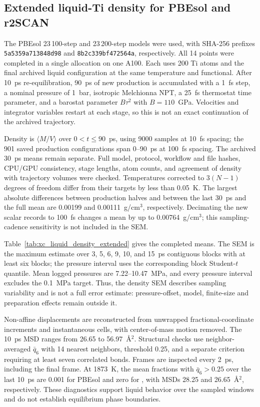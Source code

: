 \subsection{Extended liquid-Ti density for PBEsol and r2SCAN}
\label{sec:xc_liquid_density_extended}
The PBEsol 23\,100-step and \rscan{} 23\,200-step models were used, with SHA-256 prefixes \texttt{5a5359a7\allowbreak13848d98} and \texttt{8b2c339b\allowbreak f472564a}, respectively. All 14 points were completed in a single allocation on one A100. Each uses 200 Ti atoms and the final archived liquid configuration at the same temperature and functional. After 10~ps re-equilibration, 90~ps of new production is accumulated with a 1~fs step, a nominal pressure of 1~bar, isotropic Melchionna NPT, a 25~fs thermostat time parameter, and a barostat parameter $B\tau^2$ with $B=110$~GPa. Velocities and integrator variables restart at each stage, so this is not an exact continuation of the archived trajectory.

Density is $\langle M/V\rangle$ over $0<t\leq90$~ps, using 9000 samples at 10~fs spacing; the 901 saved production configurations span 0--90~ps at 100~fs spacing. The archived 30~ps means remain separate. Full model, protocol, workflow and file hashes, CPU/GPU consistency, stage lengths, atom counts, and agreement of density with trajectory volumes were checked. Temperatures corrected to $3(N-1)$ degrees of freedom differ from their targets by less than 0.05~K. The largest absolute differences between production halves and between the last 30~ps and the full mean are 0.00199 and 0.00111~g/cm$^3$, respectively. Decimating the new scalar records to 100~fs changes a mean by up to 0.00764~g/cm$^3$; this sampling-cadence sensitivity is not included in the SEM.

Table~\ref{tab:xc_liquid_density_extended} gives the completed means. The SEM is the maximum estimate over 3, 5, 6, 9, 10, and 15~ps contiguous blocks with at least six blocks; the pressure interval uses the corresponding block Student-$t$ quantile. Mean logged pressures are 7.22--10.47~MPa, and every pressure interval excludes the 0.1~MPa target. Thus, the density SEM describes sampling variability and is not a full error estimate: pressure-offset, model, finite-size and preparation effects remain outside it.

Non-affine displacements are reconstructed from unwrapped fractional-coordinate increments and instantaneous cells, with center-of-mass motion removed. The 10~ps MSD ranges from 26.65 to 56.97~\AA$^2$. Structural checks use neighbor-averaged $\bar q_6$ with 14 nearest neighbors, threshold 0.25, and a separate criterion requiring at least seven correlated bonds. Frames are inspected every 2~ps, including the final frame. At 1873~K, the mean fractions with $\bar q_6>0.25$ over the last 10~ps are 0.001 for PBEsol and zero for \rscan{}, with MSDs 28.25 and 26.65~\AA$^2$, respectively. These diagnostics support liquid behavior over the sampled windows and do not establish equilibrium phase boundaries.

